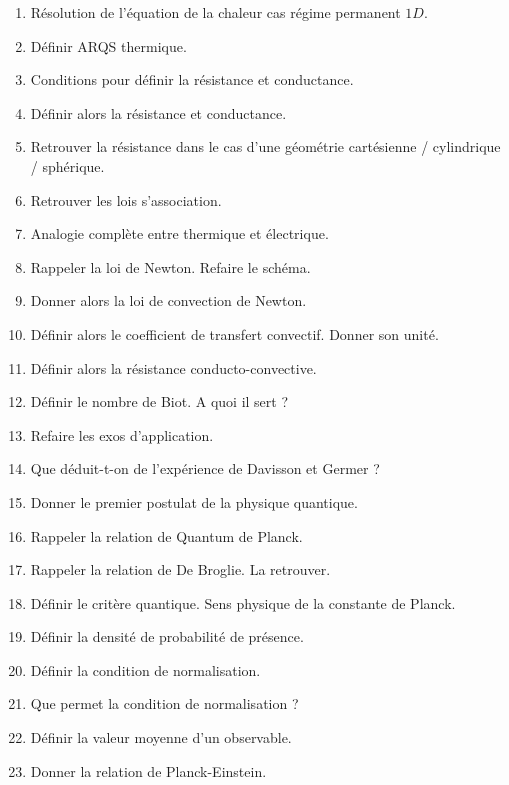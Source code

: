 \documentclass[a4paper, 11pt, hidelinks]{article}
\begin{document}
\begin{enumerate}
    \item Résolution de l'équation de la chaleur cas régime permanent $1D$. \cite{Chapitre20}
    \item Définir ARQS thermique.\cite{Chapitre20}
    \item Conditions pour définir la résistance et conductance. \cite{Chapitre20}
    \item Définir alors la résistance et conductance. \cite{Chapitre20}
    \item Retrouver la résistance dans le cas d'une géométrie cartésienne / cylindrique / sphérique. \cite{Chapitre20}
    \item Retrouver les lois s'association. \cite{Chapitre20}
    \item Analogie complète entre thermique et électrique. \cite{Chapitre20}
    \item Rappeler la loi de Newton. Refaire le schéma. \cite{Chapitre20}
    \item Donner alors la loi de convection de Newton. \cite{Chapitre20}
    \item Définir alors le coefficient de transfert convectif. Donner son unité. \cite{Chapitre20}
    \item Définir alors la résistance conducto-convective. \cite{Chapitre20}
    \item Définir le nombre de Biot. A quoi il sert ? \cite{Chapitre20}
    \item Refaire les exos d'application. \cite{Chapitre20}
    \item Que déduit-t-on de l'expérience de Davisson et Germer ? \cite{Chapitre21}
    \item Donner le premier postulat de la physique quantique. \cite{Chapitre21}
    \item Rappeler la relation de Quantum de Planck. \cite{Chapitre21}
    \item Rappeler la relation de De Broglie. La retrouver. \cite{Chapitre21}
    \item Définir le critère quantique. Sens physique de la constante de Planck. \cite{Chapitre21}
    \item Définir la densité de probabilité de présence. \cite{Chapitre21}
    \item Définir la condition de normalisation. \cite{Chapitre21}
    \item Que permet la condition de normalisation ? \cite{Chapitre21}
    \item Définir la valeur moyenne d'un observable. \cite{Chapitre21}
    \item Donner la relation de Planck-Einstein. \cite{Chapitre21}

\end{enumerate}
\end{document}
